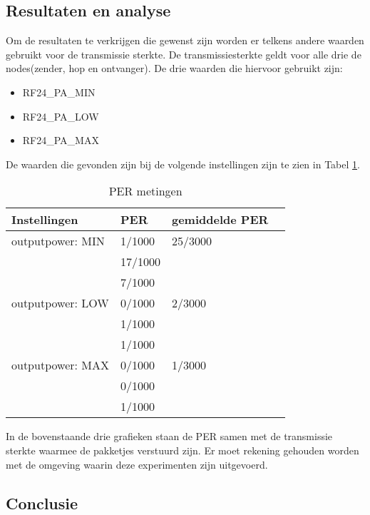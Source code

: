 \documentclass{article}
\begin{document}
\subsection{Resultaten en analyse}

Om de resultaten te verkrijgen die gewenst zijn worden er telkens andere waarden gebruikt voor de transmissie sterkte.
De transmissiesterkte geldt voor alle drie de nodes(zender, hop en ontvanger). De drie waarden die hiervoor gebruikt zijn:

\begin{itemize}
	\item RF24\_PA\_MIN
	\item RF24\_PA\_LOW
	\item RF24\_PA\_MAX
\end{itemize}
De waarden die gevonden zijn bij de volgende instellingen zijn te zien in Tabel \ref{table:hopresults}.

\begin{table}[h]
\centering \caption{PER metingen}
\label{table:hopresults}
    \begin{tabular}{ | l | l | l | p{5cm} |}
    \hline
    Instellingen 				& PER 		& gemiddelde PER\\ \hline
    outputpower: MIN 			& 1/1000 	& 25/3000		\\
    							& 17/1000 	& 				\\
   								& 7/1000	&  				\\ \hline
    outputpower: LOW 			& 0/1000 	& 2/3000		\\
    							& 1/1000 	& 				\\
   								& 1/1000	&  				\\ \hline
    outputpower: MAX 			& 0/1000 	& 1/3000		\\
    							& 0/1000 	& 				\\
   								& 1/1000	&  				\\ \hline
    \end{tabular}
\end{table}

In de bovenstaande drie grafieken staan de PER samen met de transmissie sterkte waarmee de pakketjes verstuurd zijn. Er moet rekening gehouden worden met de omgeving waarin deze experimenten zijn uitgevoerd. 

\subsection{Conclusie}
\end{document}
